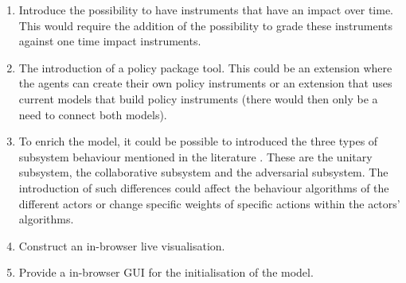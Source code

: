 \begin{enumerate}
\item Introduce the possibility to have instruments that have an impact over time. This would require the addition of the possibility to grade these instruments against one time impact instruments.
\item The introduction of a policy package tool. This could be an extension where the agents can create their own policy instruments or an extension that uses current models that build policy instruments (there would then only be a need to connect both models).
\item To enrich the model, it could be possible to introduced the three types of subsystem behaviour mentioned in the literature \citep{weible2008expert, nohrstedt2010logic}. These are the unitary subsystem, the collaborative subsystem and the adversarial subsystem. The introduction of such differences could affect the behaviour algorithms of the different actors or change specific weights of specific actions within the actors' algorithms.
\item Construct an in-browser live visualisation.
\item Provide a in-browser GUI for the initialisation of the model.
\end{enumerate}